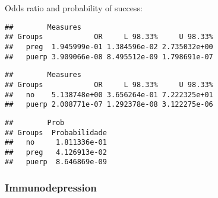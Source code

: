 \documentclass[
]{article}
\newenvironment{Shaded}{\begin{snugshade}}{\end{snugshade}}
\newcommand{\CommentTok}[1]{\textcolor[rgb]{0.56,0.35,0.01}{\textit{#1}}}
\newcommand{\KeywordTok}[1]{\textcolor[rgb]{0.13,0.29,0.53}{\textbf{#1}}}
\newcommand{\NormalTok}[1]{#1}
\newcommand{\OperatorTok}[1]{\textcolor[rgb]{0.81,0.36,0.00}{\textbf{#1}}}
\newcommand{\StringTok}[1]{\textcolor[rgb]{0.31,0.60,0.02}{#1}}
\begin{document}
Odds ratio and probability of success:

\begin{Shaded}
\end{Shaded}

\begin{verbatim}
##        Measures
## Groups            OR     L 98.33%     U 98.33%
##   preg  1.945999e-01 1.384596e-02 2.735032e+00
##   puerp 3.909066e-08 8.495512e-09 1.798691e-07
\end{verbatim}

\begin{Shaded}
\end{Shaded}

\begin{verbatim}
##        Measures
## Groups            OR     L 98.33%     U 98.33%
##   no    5.138748e+00 3.656264e-01 7.222325e+01
##   puerp 2.008771e-07 1.292378e-08 3.122275e-06
\end{verbatim}

\begin{Shaded}
\end{Shaded}

\begin{verbatim}
##        Prob
## Groups  Probabilidade
##   no     1.811336e-01
##   preg   4.126913e-02
##   puerp  8.646869e-09
\end{verbatim}

\hypertarget{immunodepression-1}{%
\subsubsection{Immunodepression}\label{immunodepression-1}}

\begin{Shaded}
\end{Shaded}
\end{document}
